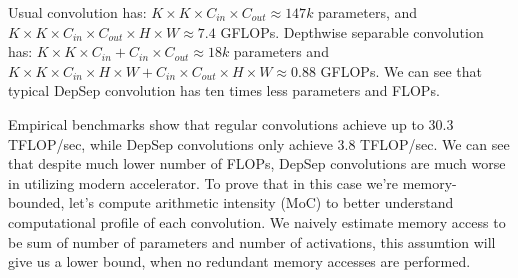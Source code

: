 Usual convolution has: $ K \times K \times C_{in} \times C_{out} \approx 147k$ parameters, and $ K \times K \times C_{in} \times C_{out} \times H \times W \approx 7.4 $ GFLOPs. Depthwise separable convolution has: $ K \times K \times C_{in} + C_{in} \times C_{out} \approx 18k$ parameters and $ K \times K \times C_{in} \times H \times W + C_{in} \times C_{out} \times H \times W \approx 0.88$ GFLOPs. We can see that typical DepSep convolution has ten times less parameters and FLOPs.


% 

% 

Empirical benchmarks show that regular convolutions achieve up to 30.3 TFLOP/sec, while DepSep convolutions only achieve 3.8 TFLOP/sec. We can see that despite much lower number of FLOPs, DepSep convolutions are much worse in utilizing modern accelerator. To prove that in this case we're memory-bounded, let's compute arithmetic intensity (MoC) to better understand computational profile of each convolution. We naively estimate memory access to be sum of number of parameters and number of activations, this assumtion will give us a lower bound, when no redundant memory accesses are performed. 

